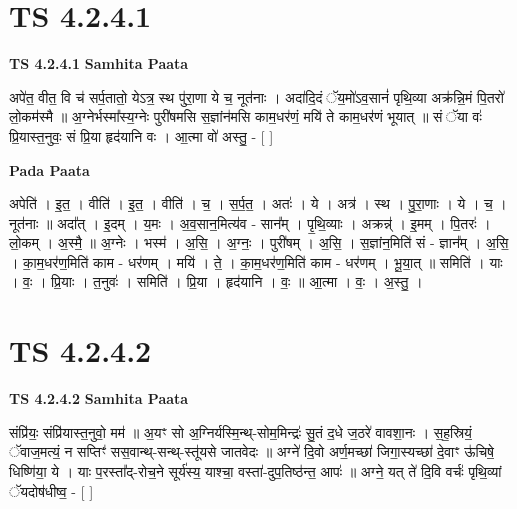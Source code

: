 \documentclass[17pt]{extarticle}
\begin{document}

\section{ TS 4.2.4.1 }

\textbf{TS 4.2.4.1 } \newline
\textbf{Samhita Paata} \newline

अपे॑त॒ वीत॒ वि च॑ सर्प॒तातो॒ येऽत्र॒ स्थ पु॑रा॒णा ये च॒ नूत॑नाः । अदा॑दि॒दं ॅय॒मो॑ऽव॒सानं॑ पृथि॒व्या अक्र॑न्नि॒मं पि॒तरो॑ लो॒कम॑स्मै ॥ अ॒ग्नेर्भस्मा᳚स्य॒ग्नेः पुरी॑षमसि स॒ज्ञांन॑मसि काम॒धर॑णं॒ मयि॑ ते काम॒धर॑णं भूयात् ॥ सं ॅया वः॑ प्रि॒यास्त॒नुवः॒ सं प्रि॒या हृद॑यानि वः । आ॒त्मा वो॑ अस्तु॒ - [  ] \newline

\textbf{Pada Paata} \newline

अपेति॑ । इ॒त॒ । वीति॑ । इ॒त॒ । वीति॑ । च॒ । स॒र्प॒त॒ । अतः॑ । ये । अत्र॑ । स्थ । पु॒रा॒णाः । ये । च॒ । नूत॑नाः ॥ अदा᳚त् । इ॒दम् । य॒मः । अ॒व॒सान॒मित्य॑व - सान᳚म् । पृ॒थि॒व्याः । अक्रन्न्॑ । इ॒मम् । पि॒तरः॑ । लो॒कम् । अ॒स्मै॒ ॥ अ॒ग्नेः । भस्म॑ । अ॒सि॒ । अ॒ग्नः॒ । पुरी॑षम् । अ॒सि॒ । स॒ज्ञांन॒मिति॑ सं - ज्ञान᳚म् । अ॒सि॒ । का॒म॒धर॑ण॒मिति॑ काम - धर॑णम् । मयि॑ । ते॒ । का॒म॒धर॑ण॒मिति॑ काम - धर॑णम् । भू॒या॒त् ॥ समिति॑ । याः । वः॒ । प्रि॒याः । त॒नुवः॑ । समिति॑ । प्रि॒या । हृद॑यानि । वः॒ ॥ आ॒त्मा । वः॒ । अ॒स्तु॒ ।  \newline





\section{ TS 4.2.4.2 }

\textbf{TS 4.2.4.2 } \newline
\textbf{Samhita Paata} \newline

संप्रि॑यः॒ संप्रि॑यास्त॒नुवो॒ मम॑ ॥ अ॒यꣳ सो अ॒ग्निर्यस्मि॒न्थ्-सोम॒मिन्द्रः॑ सु॒तं द॒धे ज॒ठरे॑ वावशा॒नः । स॒ह॒स्रियं॒ ॅवाज॒मत्यं॒ न सप्तिꣳ॑ सस॒वान्थ्-सन्थ्-स्तू॑यसे जातवेदः ॥ अग्ने॑ दि॒वो अर्ण॒मच्छा॑ जिगा॒स्यच्छा॑ दे॒वाꣳ ऊ॑चिषे॒ धिष्णि॑या॒ ये । याः प॒रस्ता᳚द्-रोच॒ने सूर्य॑स्य॒ याश्चा॒ वस्ता॑-दुप॒तिष्ठ॑न्त॒ आपः॑ ॥ अग्ने॒ यत् ते॑ दि॒वि वर्चः॑ पृथि॒व्यां ॅयदोष॑धीष्व॒ - [  ] \newline
\end{document}
